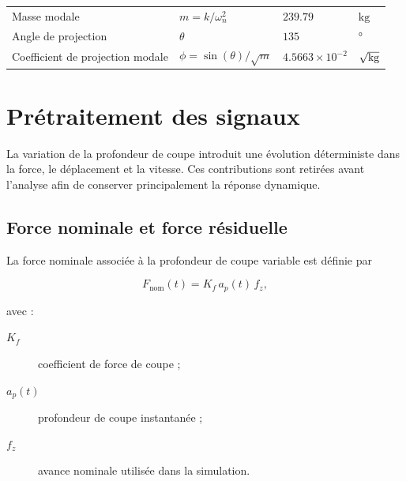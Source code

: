 \documentclass[
    11pt,
    a4paper
]{article}
\begin{document}
\begin{table}[H]
\begin{tabular}{llll}
        Masse modale
        & \(m=k/\omega_n^2\)
        & \(239.79\)
        & \(\si{\kilogram}\) \\

        Angle de projection
        & \(\theta\)
        & \(135\)
        & \(\si{\degree}\) \\

        Coefficient de projection modale
        & \(\phi=\sin(\theta)/\sqrt{m}\)
        & \(4.5663\times10^{-2}\)
        & \(\si{\per\sqrt{\kilogram}}\) \\

        \bottomrule
    \end{tabular}
\end{table}






\section{Prétraitement des signaux}
\label{sec:pretraitement}

La variation de la profondeur de coupe introduit une évolution déterministe dans
la force, le déplacement et la vitesse. Ces contributions sont retirées avant
l'analyse afin de conserver principalement la réponse dynamique.

\subsection{Force nominale et force résiduelle}
\label{subsec:force-residuelle}

La force nominale associée à la profondeur de coupe variable est définie par

\begin{equation}
    F_{\mathrm{nom}}(t)
    =
    K_f\,a_p(t)\,f_z,
    \label{eq:force-nominale}
\end{equation}

avec :

\begin{description}
    \item[\(K_f\)] coefficient de force de coupe ;
    \item[\(a_p(t)\)] profondeur de coupe instantanée ;
    \item[\(f_z\)] avance nominale utilisée dans la simulation.
\end{description}
\end{document}
